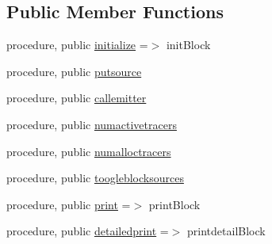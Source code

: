 \subsection*{Public Member Functions}
\begin{DoxyCompactItemize}
\item 
procedure, public \mbox{\hyperlink{structblocks__mod_1_1block__class_ad671745ca5dc3227ddb0ed1d9ff45268}{initialize}} =$>$ init\+Block
\item 
procedure, public \mbox{\hyperlink{structblocks__mod_1_1block__class_ac79980e841902691a06212dce50f6331}{putsource}}
\item 
procedure, public \mbox{\hyperlink{structblocks__mod_1_1block__class_ad1d0f1aca1323fad86177deb0b818a51}{callemitter}}
\item 
procedure, public \mbox{\hyperlink{structblocks__mod_1_1block__class_a6e9993302da517acd9420dea33de6b43}{numactivetracers}}
\item 
procedure, public \mbox{\hyperlink{structblocks__mod_1_1block__class_a7a3f2eb6823a683a6aaa2159b50ee990}{numalloctracers}}
\item 
procedure, public \mbox{\hyperlink{structblocks__mod_1_1block__class_a73bd9f99f97d7fd882a3ade1103d27ae}{toogleblocksources}}
\item 
procedure, public \mbox{\hyperlink{structblocks__mod_1_1block__class_a43b4c133934eaadb55d30cf834d1e28c}{print}} =$>$ print\+Block
\item 
procedure, public \mbox{\hyperlink{structblocks__mod_1_1block__class_a937d8dca8393460bc718dafa8a5c03ac}{detailedprint}} =$>$ printdetail\+Block
\end{DoxyCompactItemize}
